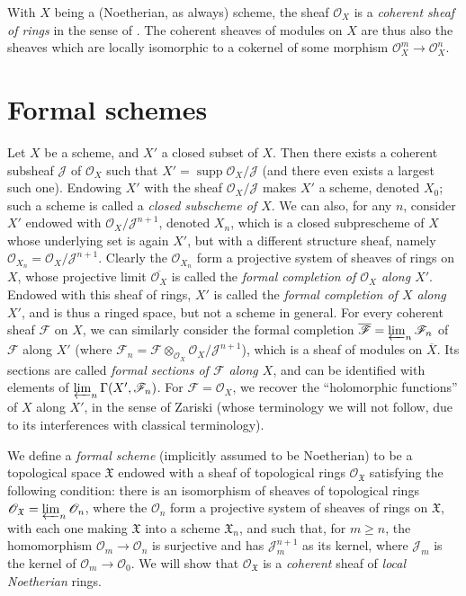 \documentclass{article}
\newcommand{\scr}[1]{{\mathscr{#1}}}
\newcommand{\fk}{\mathfrak}
\renewcommand{\geq}{\geqslant}
\DeclareMathOperator{\supp}{supp}
\newcommand{\oldpage}[1]{\marginpar{\footnotesize$\Big\vert$ \textit{p.~#1}}}
\begin{document}
With $X$ being a (Noetherian, as always) scheme, the sheaf $\scr{O}_X$ is a \emph{coherent sheaf of rings} in the sense of \cite{2}.
The coherent sheaves of modules on $X$ are thus also the sheaves which are locally isomorphic to a cokernel of some morphism $\scr{O}_X^m\to\scr{O}_X^n$.


\section{Formal schemes}
\label{section2}

Let $X$ be a scheme, and $X'$ a closed subset of $X$.
Then there exists a coherent subsheaf $\scr{J}$ of $\scr{O}_X$ such that $X'=\supp\scr{O}_X/\scr{J}$ (and there even exists a largest such one).
Endowing $X'$ with the sheaf $\scr{O}_X/\scr{J}$ makes $X'$ a scheme, denoted $X_0$;
such a scheme is called a \emph{closed subscheme of $X$}.
We can also, for any $n$, consider $X'$ endowed with $\scr{O}_X/\scr{J}^{n+1}$, denoted $X_n$, which is a closed subprescheme of $X$ whose underlying set is again $X'$, but with a different structure sheaf, namely $\scr{O}_{X_n}=\scr{O}_X/\scr{J}^{n+1}$.
Clearly the $\scr{O}_{X_n}$ form a projective system of sheaves of rings on $X$, whose projective limit $\overline{\scr{O}_X}$ is called the \emph{formal completion of $\scr{O}_X$ along $X'$}.
Endowed with this sheaf of rings, $X'$ is called the \emph{formal completion of $X$ along $X'$}, and is thus a ringed space, but not a scheme in general.
For every coherent sheaf $\scr{F}$ on $X$, we can similarly consider the formal completion $\overline{\scr{F}}=\varprojlim_n\scr{F}_n$ of $\scr{F}$ along $X'$ (where $\scr{F}_n=\scr{F}\otimes_{\scr{O}_X}\scr{O}_X/\scr{J}^{n+1}$), which is a sheaf of modules on $\overline{X}$.
Its sections are called \emph{formal sections of $\scr{F}$ along $X$}, and can be identified with elements of $\varprojlim_n\Gamma(X',\scr{F}_n)$.
For $\scr{F}=\scr{O}_X$, we recover the ``holomorphic functions'' of $X$ along $X'$, in the sense of Zariski (whose terminology we will not follow, due to its interferences with classical terminology).

We define a \emph{formal scheme} (implicitly assumed to be Noetherian) to be a topological space $\fk{X}$ endowed with a sheaf of topological rings $\scr{O}_{\fk{X}}$ satisfying the following condition:
there is an isomorphism of sheaves of topological rings $\scr{O}_{\fk{X}}=\varprojlim_n\scr{O}_n$, where the $\scr{O}_n$ form a projective system of sheaves of rings on $\fk{X}$, with each one making $\fk{X}$ into a scheme $\fk{X}_n$, and such that, for $m\geq n$, the homomorphism $\scr{O}_m\to\scr{O}_n$ is surjective and has $\scr{J}_m^{n+1}$ as its kernel, where $\scr{J}_m$ is
\oldpage{182-04}
the kernel of $\scr{O}_m\to\scr{O}_0$.
We will show that $\scr{O}_{\fk{X}}$ is a \emph{coherent} sheaf of \emph{local Noetherian} rings.
\end{document}
